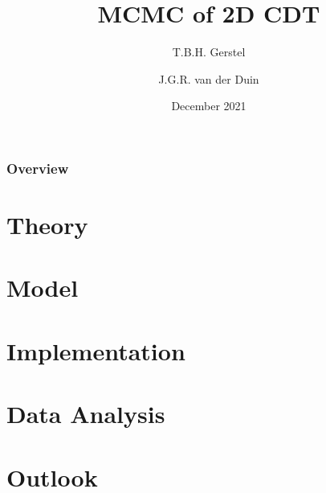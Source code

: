 \documentclass{beamer}
\title{MCMC of 2D CDT}
\author{T.B.H. Gerstel \and J.G.R. van der Duin}
\date{December 2021}
\institute{Radboud University Nijmegen}
\begin{document}
\frame{\titlepage}

\begin{frame}
    \frametitle{Overview}
    \tableofcontents
\end{frame}

\section{Theory}



\section{Model}


\section{Implementation} %


\section{Data Analysis}


\section{Outlook}

\end{document}
